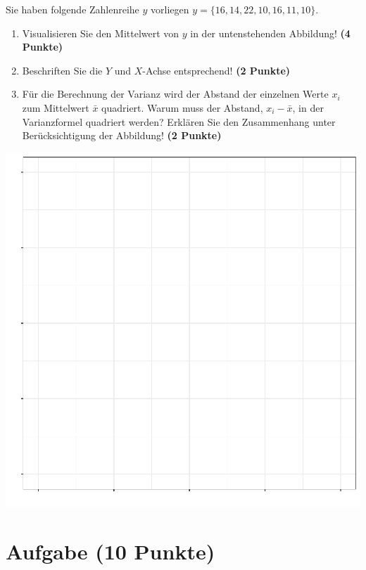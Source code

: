 \documentclass[a4paper, 10pt]{scrartcl}\usepackage[]{graphicx}\usepackage[]{xcolor}
\makeatletter
\def\maxwidth{ %
  \ifdim\Gin@nat@width>\linewidth
    \linewidth
  \else
    \Gin@nat@width
  \fi
}
\makeatother
\begin{document}
Sie haben folgende Zahlenreihe $y$ vorliegen
$y = \{16, 14, 22, 10, 16, 11, 10\}$.

\begin{enumerate}
\item Visualisieren Sie den Mittelwert von $y$ in der untenstehenden
  Abbildung! \textbf{(4 Punkte)}
\item Beschriften Sie die $Y$ und $X$-Achse entsprechend! \textbf{(2 Punkte)}
\item F{\"u}r die Berechnung der Varianz wird der Abstand der einzelnen Werte $x_i$
  zum Mittelwert $\bar{x}$ quadriert. Warum muss der Abstand, $x_i -
  \bar{x}$, in der Varianzformel quadriert werden?
  Erkl{\"a}ren Sie den Zusammenhang unter Ber{\"u}cksichtigung der Abbildung!
  \textbf{(2 Punkte)}  
\end{enumerate}



{\centering \includegraphics[width=\maxwidth]{img/desc-01-1} 

}


 
\clearpage

\section{Aufgabe \hfill (10 Punkte)}
\end{document}

